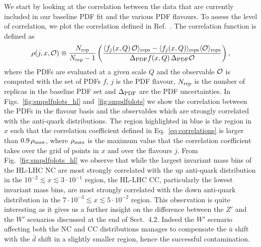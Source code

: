 \documentclass[withindex,glossary]{cam-thesis}
\begin{document}
We start by looking at the correlation between the data that are currently included in our baseline PDF fit 
and the various PDF flavours. To assess the level of correlation, we plot the correlation defined in Ref.~\cite{Carrazza:2016htc}. 
The correlation function is defined as
\begin{equation}
\label{eq:correlations}
    \rho(j,x,{\cal O})\equiv\frac{N_{\rm rep}}{N_{\rm rep}-1}
    \left(\frac{\langle f_j(x,Q)\,{\cal O}\rangle_{\rm reps}-\langle f_j(x,Q)\rangle_{\rm reps}\langle {\cal O}\rangle_{\rm reps}}{\Delta_{\rm PDF}f(x,Q)\,\Delta_{\rm PDF}{\cal O}}\right),
\end{equation}
where the PDFs are evaluated at a given scale $Q$ and the observable ${\cal O}$ is computed with the set of PDFs $f$, $j$ is the PDF 
flavour, $N_{\rm rep}$ is the number of replicas in the baseline PDF set and $\Delta_{\rm PDF}$ are the PDF uncertainties. 
In Figs.~\ref{fig:smpdfplots_hl} and~\ref{fig:smpdfplots} we show the correlation between the PDFs in the flavour basis 
and the observables which are strongly correlated with the anti-quark distributions. 
The region highlighted in blue is the region in $x$ such that the correlation 
coefficient defined in Eq.~\eqref{eq:correlations} is larger than $0.9 \, \rho_{\rm max}$, where $\rho_{\rm max}$ is 
the maximum value that the correlation coefficient takes over the grid of points in $x$ and over the flavours $j$.
From Fig.~\ref{fig:smpdfplots_hl} we observe that while the largest invariant mass bins of 
the HL-LHC NC are most strongly correlated with the up anti-quark distribution in the $10^{-2}\lesssim x \lesssim 3\cdot 10^{-1}$ region, 
the HL-LHC CC, particularly the lowest invariant mass bins, are most strongly correlated with the down anti-quark distribution in 
the $ 7\cdot 10^{-3}\lesssim x \lesssim 5\cdot 10^{-2}$ region. This observation is quite interesting as it gives us a further insight on the 
difference between the $Z'$ and the $W'$ scenarios discussed at the end of Sect.~4.2. Indeed the $W'$ scenario affecting both the 
NC and CC distributions manages to compensate the $\bar{u}$ shift with the $\bar{d}$ shift in a slightly smaller region, hence the 
successful contamination. 
\end{document}
